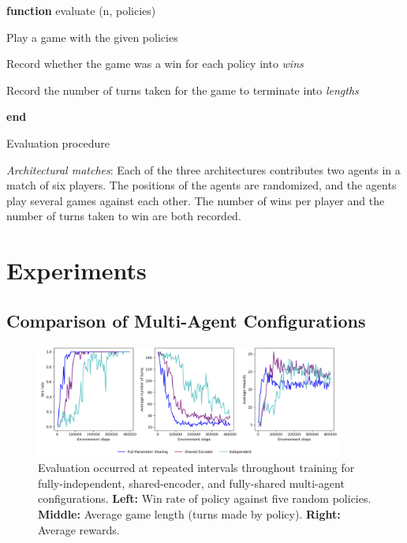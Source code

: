\documentclass[12pt, a4paper, twocolumn]{article}
\begin{document}
\begin{algorithm}

  \textbf{function} evaluate (n, policies)

  \Indp
  

   {
    Play a game with the given policies

    Record whether the game was a win for each policy into \textit{wins}

    Record the number of turns taken for the game to terminate into \textit{lengths}
  }


  \Indm

  \textbf{end}

  
  \caption{Evaluation procedure}
\end{algorithm}

\textit{Architectural matches}: Each of the three architectures contributes two agents in a match of six players. The positions of the agents are randomized, and the agents play several games against each other. The number of wins per player and the number of turns taken to win are both recorded.


\section{Experiments}

\subsection{Comparison of Multi-Agent Configurations}


\begin{figure}[]
  \centering
    \includegraphics[width=0.9\textwidth]{images/comparing_marl.png}
  \caption{Evaluation occurred at repeated intervals throughout training for fully-independent, shared-encoder, and fully-shared multi-agent configurations. \textbf{Left:} Win rate of policy against five random policies. \textbf{Middle:} Average game length (turns made by policy). \textbf{Right:} Average rewards.}\label{fig:win_rate_game_length}
\end{figure}
\end{document}
